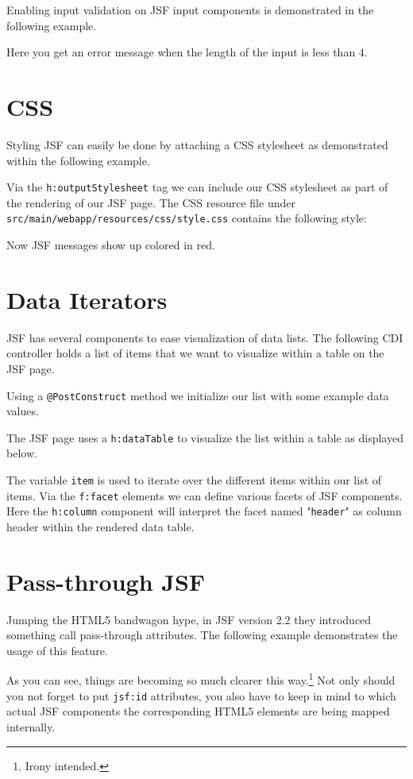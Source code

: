 Enabling input validation on JSF input components is demonstrated in the following example.

Here you get an error message when the length of the input is less than 4.

\section{CSS}

Styling JSF can easily be done by attaching a CSS stylesheet as demonstrated within the following example.

Via the \texttt{h:outputStylesheet} tag we can include our CSS stylesheet as part of the rendering of our JSF page.
The CSS resource file under
\texttt{src/main/webapp/resources/css/style.css} contains the following style:

Now JSF messages show up colored in red.

\section{Data Iterators}

JSF has several components to ease visualization of data lists.
The following CDI controller holds a list of items that we want to visualize within a table on the JSF page.

Using a \texttt{@PostConstruct} method we initialize our list with some example data values.

The JSF page uses a \texttt{h:dataTable} to visualize the list within a table as displayed below.

The variable \texttt{item} is used to iterate over the different items within our list of items.
Via the \texttt{f:facet} elements we can define various facets of JSF components.
Here the \texttt{h:column} component will interpret the facet named "\texttt{header}" as column header within the rendered data table.

\section{Pass-through JSF}
Jumping the HTML5 bandwagon hype, in JSF version 2.2 they introduced something call pass-through attributes.
The following example demonstrates the usage of this feature.

As you can see, things are becoming so much clearer this way.\footnote{Irony intended.}
Not only should you not forget to put \texttt{jsf:id} attributes,
you also have to keep in mind to which actual JSF components the corresponding HTML5 elements are being mapped internally.

